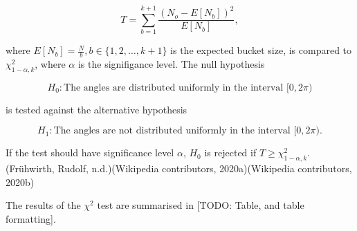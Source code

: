 \documentclass[
]{article}
\begin{document}
\begin{equation}
T = \sum_{b=1}^{k+1}{\frac{(N_o - E[N_b])^2}{E[N_b]}},
\end{equation}

where \(E[N_b] = \frac{N}{b}, b \in \{1, 2, \dots , k+1\}\) is the
expected bucket size, is compared to \(\chi^2_{1-\alpha, k}\), where
\(\alpha\) is the signifigance level. The null hypothesis

\[
H_0: \textrm{The angles are distributed uniformly in the interval } [0, 2 \pi)
\]

is tested against the alternative hypothesis

\[
H_1: \textrm{The angles are not distributed uniformly in the interval } [0, 2 \pi) \textrm{.}
\]

If the test should have significance level \(\alpha\), \(H_0\) is
rejected if \(T \ge \chi^2_{1-\alpha, k}\).(Frühwirth, Rudolf,
n.d.)(Wikipedia contributors, 2020a)(Wikipedia contributors, 2020b)

The results of the \(\chi^2\) test are summarised in {[}TODO: Table, and
table formatting{]}.
\end{document}
